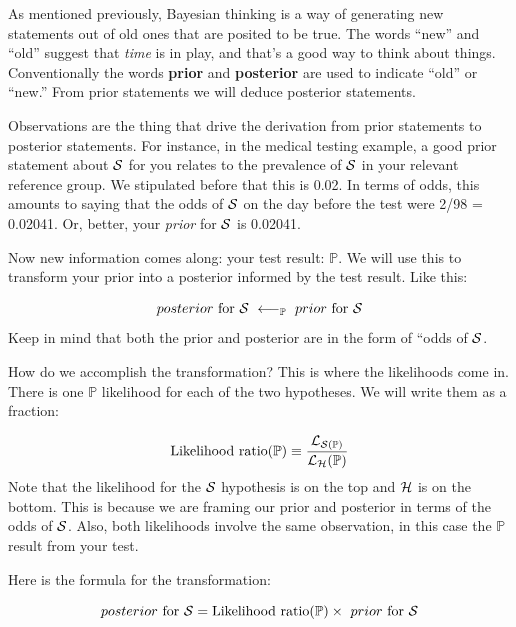 \documentclass[
  letterpaper,
  DIV=11,
  numbers=noendperiod,
  oneside]{scrartcl}
\begin{document}
As mentioned previously, Bayesian thinking is a way of generating new
statements out of old ones that are posited to be true. The words
``new'' and ``old'' suggest that \emph{time} is in play, and that's a
good way to think about things. Conventionally the words \textbf{prior}
and \textbf{posterior} are used to indicate ``old'' or ``new.'' From
prior statements we will deduce posterior statements.

Observations are the thing that drive the derivation from prior
statements to posterior statements. For instance, in the medical testing
example, a good prior statement about \({\cal S}\) for you relates to
the prevalence of \({\cal S}\) in your relevant reference group. We
stipulated before that this is 0.02. In terms of odds, this amounts to
saying that the odds of \({\cal S}\) on the day before the test were
2/98 = 0.02041. Or, better, your \emph{prior} for \({\cal S}\) is
0.02041.

Now new information comes along: your test result: \({\mathbb{P}}\). We
will use this to transform your prior into a posterior informed by the
test result. Like this:

\[posterior\ \text{for } {\cal S}\ \longleftarrow_{\mathbb{P}}\ prior\ \text{for }{\cal S}\]
Keep in mind that both the prior and posterior are in the form of ``odds
of \({\cal S}\).

How do we accomplish the transformation? This is where the likelihoods
come in. There is one \({\mathbb{P}}\) likelihood for each of the two
hypotheses. We will write them as a fraction:

\[\text{Likelihood ratio}({\mathbb{P}}) \equiv\frac{{\cal L}_{{\cal S}({\mathbb{P}})}}{{\cal L}_{\cal H}({{\mathbb{P}}})}\]
Note that the likelihood for the \({\cal S}\) hypothesis is on the top
and \({\cal H}\) is on the bottom. This is because we are framing our
prior and posterior in terms of the odds of \({\cal S}\). Also, both
likelihoods involve the same observation, in this case the
\({\mathbb{P}}\) result from your test.

Here is the formula for the transformation:

\[posterior\ \text{for } {\cal S}= \text{Likelihood ratio(}{\mathbb{P}}\text{)} \times \ prior\ \text{for }{\cal S}\]
\end{document}
